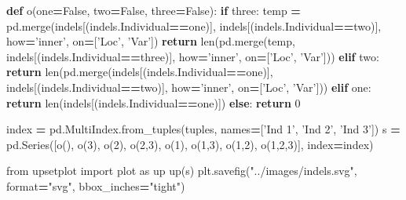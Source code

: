 \documentclass[]{book}
\newenvironment{Shaded}{\begin{snugshade}}{\end{snugshade}}
\newcommand{\BuiltInTok}[1]{#1}
\newcommand{\ControlFlowTok}[1]{\textcolor[rgb]{0.13,0.29,0.53}{\textbf{#1}}}
\newcommand{\DecValTok}[1]{\textcolor[rgb]{0.00,0.00,0.81}{#1}}
\newcommand{\ImportTok}[1]{#1}
\newcommand{\KeywordTok}[1]{\textcolor[rgb]{0.13,0.29,0.53}{\textbf{#1}}}
\newcommand{\NormalTok}[1]{#1}
\newcommand{\OperatorTok}[1]{\textcolor[rgb]{0.81,0.36,0.00}{\textbf{#1}}}
\newcommand{\StringTok}[1]{\textcolor[rgb]{0.31,0.60,0.02}{#1}}
\newcommand{\VariableTok}[1]{\textcolor[rgb]{0.00,0.00,0.00}{#1}}
\begin{document}
\begin{Shaded}
\begin{Highlighting}[]
\KeywordTok{def}\NormalTok{ o(one}\OperatorTok{=}\VariableTok{False}\NormalTok{, two}\OperatorTok{=}\VariableTok{False}\NormalTok{, three}\OperatorTok{=}\VariableTok{False}\NormalTok{):}
    \ControlFlowTok{if}\NormalTok{ three:}
\NormalTok{        temp }\OperatorTok{=}\NormalTok{ pd.merge(indels[(indels.Individual}\OperatorTok{==}\NormalTok{one)], indels[(indels.Individual}\OperatorTok{==}\NormalTok{two)], how}\OperatorTok{=}\StringTok{'inner'}\NormalTok{, on}\OperatorTok{=}\NormalTok{[}\StringTok{'Loc'}\NormalTok{, }\StringTok{'Var'}\NormalTok{])}
        \ControlFlowTok{return} \BuiltInTok{len}\NormalTok{(pd.merge(temp, indels[(indels.Individual}\OperatorTok{==}\NormalTok{three)], how}\OperatorTok{=}\StringTok{'inner'}\NormalTok{, on}\OperatorTok{=}\NormalTok{[}\StringTok{'Loc'}\NormalTok{, }\StringTok{'Var'}\NormalTok{]))}
    \ControlFlowTok{elif}\NormalTok{ two:}
        \ControlFlowTok{return} \BuiltInTok{len}\NormalTok{(pd.merge(indels[(indels.Individual}\OperatorTok{==}\NormalTok{one)], indels[(indels.Individual}\OperatorTok{==}\NormalTok{two)], how}\OperatorTok{=}\StringTok{'inner'}\NormalTok{, on}\OperatorTok{=}\NormalTok{[}\StringTok{'Loc'}\NormalTok{, }\StringTok{'Var'}\NormalTok{]))}
    \ControlFlowTok{elif}\NormalTok{ one:}
        \ControlFlowTok{return} \BuiltInTok{len}\NormalTok{(indels[(indels.Individual}\OperatorTok{==}\NormalTok{one)])}
    \ControlFlowTok{else}\NormalTok{:}
        \ControlFlowTok{return} \DecValTok{0}

\NormalTok{index }\OperatorTok{=}\NormalTok{ pd.MultiIndex.from_tuples(tuples, names}\OperatorTok{=}\NormalTok{[}\StringTok{'Ind 1'}\NormalTok{, }\StringTok{'Ind 2'}\NormalTok{, }\StringTok{'Ind 3'}\NormalTok{])}
\NormalTok{s }\OperatorTok{=}\NormalTok{ pd.Series([o(),}
\NormalTok{               o(}\DecValTok{3}\NormalTok{),}
\NormalTok{               o(}\DecValTok{2}\NormalTok{),}
\NormalTok{               o(}\DecValTok{2}\NormalTok{,}\DecValTok{3}\NormalTok{),}
\NormalTok{               o(}\DecValTok{1}\NormalTok{),}
\NormalTok{               o(}\DecValTok{1}\NormalTok{,}\DecValTok{3}\NormalTok{),}
\NormalTok{               o(}\DecValTok{1}\NormalTok{,}\DecValTok{2}\NormalTok{),}
\NormalTok{               o(}\DecValTok{1}\NormalTok{,}\DecValTok{2}\NormalTok{,}\DecValTok{3}\NormalTok{)], index}\OperatorTok{=}\NormalTok{index)}

\ImportTok{from}\NormalTok{ upsetplot }\ImportTok{import}\NormalTok{ plot }\ImportTok{as}\NormalTok{ up}
\NormalTok{up(s)}
\NormalTok{plt.savefig(}\StringTok{"../images/indels.svg"}\NormalTok{, }\BuiltInTok{format}\OperatorTok{=}\StringTok{"svg"}\NormalTok{, bbox_inches}\OperatorTok{=}\StringTok{"tight"}\NormalTok{)}
\end{Highlighting}
\end{Shaded}
\end{document}
